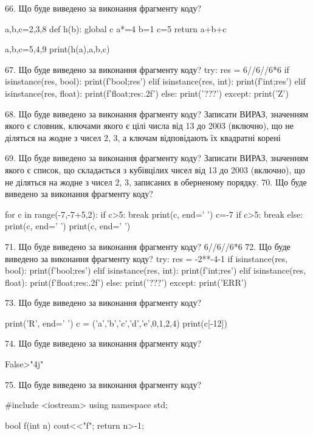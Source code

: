 \documentclass[11pt]{article}
\begin{document}
66. Що буде виведено за виконання фрагменту коду?

a,b,c=2,3,8
def h(b):
global c    a*=4
    b=1
    c=5
    return a+b+c

a,b,c=5,4,9
print(h(a),a,b,c)

67. Що буде виведено за виконання фрагменту коду?
try:
    res = 6//6//6*6
    if isinstance(res, bool):
        print(f'bool;{res}')
    elif isinstance(res, int):
        print(f'int;{res}')
    elif isinstance(res, float):
        print(f'float;{res:.2f}')
    else:
        print('???')
except:
    print('Z')

68. Що буде виведено за виконання фрагменту коду?
Записати ВИРАЗ, значенням якого є словник, ключами якого є цілі числа від 13 до 2003 (включно), що не діляться на жодне з чисел 2, 3, а ключам відповідають їх квадратні корені 

69. Що буде виведено за виконання фрагменту коду?
Записати ВИРАЗ, значенням якого є список, що складається з кубівцілих чисел від 13 до 2003 (включно), що не діляться на жодне з чисел 2, 3, записаних в оберненому порядку.
70. Що буде виведено за виконання фрагменту коду?

for c in range(-7,-7+5,2):
    if c>5:
        break
    print(c, end=' ')
    c=-7
    if c>5:
        break
else:
    print(c, end=' ')
print(c, end=' ')

71. Що буде виведено за виконання фрагменту коду?
6//6//6*6
72. Що буде виведено за виконання фрагменту коду?
try:
    res = -2**-4-1
    if isinstance(res, bool):
        print(f'bool;{res}')
    elif isinstance(res, int):
        print(f'int;{res}')
    elif isinstance(res, float):
        print(f'float;{res:.2f}')
    else:
        print('???')
except:
    print('ERR')

73. Що буде виведено за виконання фрагменту коду?

print('R', end=' ')
c = ('a','b','c','d','e',0,1,2,4)
print(c[-12])


74. Що буде виведено за виконання фрагменту коду?

False>"4j"

75. Що буде виведено за виконання фрагменту коду?

#include <iostream>
using namespace std;

bool f(int n){
    cout<<"f";
    return n>-1;
}
\end{document}
